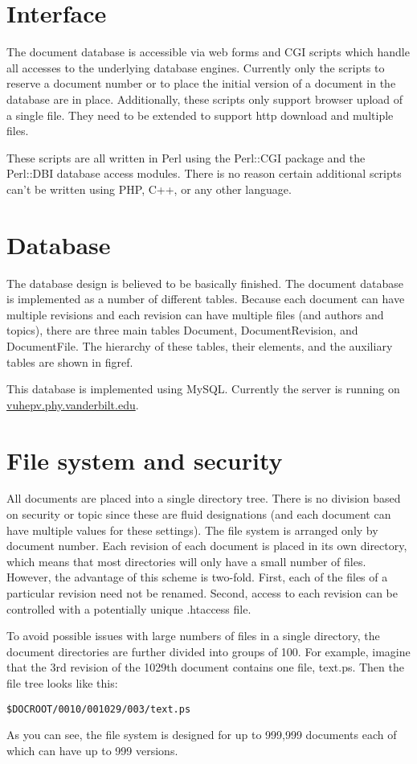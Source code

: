 \documentclass[12pt]{article}
\begin{document}
\section{Interface}

The document database is accessible via web forms and CGI scripts which 
handle all accesses to the underlying database engines. Currently only 
the scripts to reserve a document number or to place the initial 
version of a document in the database are in place. Additionally, these 
scripts only support browser upload of a single file. They need to be 
extended to support http download and multiple files.

These scripts are all written in Perl using the Perl::CGI package and 
the Perl::DBI database access modules. There is no reason certain 
additional scripts can't be written using PHP, C++, or any other 
language. 

\section{Database}

The database design is believed to be basically finished. The document 
database is implemented as a number of different tables. Because each 
document can have multiple revisions and each revision can have 
multiple files (and authors and topics), there are three main tables 
Document, DocumentRevision, and DocumentFile. The hierarchy of these 
tables, their elements, and the auxiliary tables are shown in figref.

This database is implemented using MySQL. Currently the server is 
running on \url{vuhepv.phy.vanderbilt.edu}.  

\section{File system and security}

All documents are placed into a single directory tree. There is no 
division based on security or topic since these are fluid designations 
(and each document can have multiple values for these settings). The 
file system is arranged only by document number. Each revision of each 
document is placed in its own directory, which means that most 
directories will only have a small number of files. However, the 
advantage of this scheme is two-fold. First, each of the files of a 
particular revision need not be renamed. Second, access to each 
revision can be controlled with a potentially unique .htaccess file.

To avoid possible issues with large numbers of files in a single 
directory, the document directories are further divided into groups of 
100. For example, imagine that the 3rd revision of the 1029th document 
contains one file, text.ps. Then the file tree looks like this:

\texttt{\$DOCROOT/0010/001029/003/text.ps}

As you can see, the file system is designed for up to 999,999 documents 
each of which can have up to 999 versions.
\end{document}
